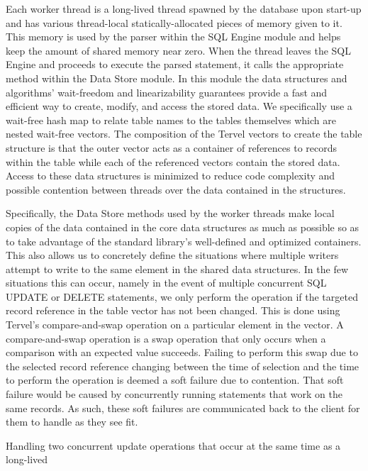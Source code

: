 \documentclass[conference, compsoc]{IEEEtran}
\begin{document}
Each worker thread is a long-lived thread spawned by the database upon start-up 
and has various thread-local statically-allocated pieces of memory given to it.
This memory is used by the parser within the SQL Engine module and helps keep the amount
of shared memory near zero. When the thread leaves the SQL Engine and proceeds to 
execute the parsed statement, it calls the appropriate method within the Data Store 
module. In this module the data structures and algorithms' wait-freedom and linearizability 
guarantees provide a fast and efficient way to create, modify, and access the stored data.  
We specifically use a wait-free hash map to relate table names to the tables themselves 
which are nested wait-free vectors. The composition of the Tervel vectors to create 
the table structure is that the outer vector acts as a container of references 
to records within the table while each of the referenced vectors contain the stored 
data. Access to these data structures is minimized to reduce code complexity and 
possible contention between threads over the data contained in the structures.
\par\vspace{\baselineskip}
Specifically, the Data Store methods used by the worker threads make local copies of 
the data contained in the core data structures as much as possible so as to take 
advantage of the standard library's well-defined and optimized containers. This also 
allows us to concretely define the situations where multiple writers attempt to write 
to the same element in the shared data structures. In the few situations this can occur, 
namely in the event of multiple concurrent SQL UPDATE or DELETE statements, we only perform
the operation if the targeted record reference in the table vector has not been changed. 
This is done using Tervel's compare-and-swap operation on a particular element in the 
vector. A compare-and-swap operation is a swap operation that only occurs when a comparison 
with an expected value succeeds. Failing to perform this swap due to the selected 
record reference changing between the time of selection and the time to perform the operation 
is deemed a soft failure due to contention. That soft failure would be caused by concurrently
running statements that work on the same records. As such, these soft failures are communicated
back to the client for them to handle as they see fit.
\par\vspace{\baselineskip}
Handling two concurrent update operations that occur at the same time as a long-lived 
\end{document}
